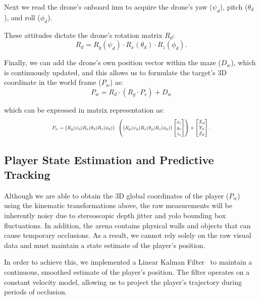 \documentclass{report_template_oxford}
\begin{document}
Next we read the drone's onboard \gls{imu} to acquire the drone's yaw ($\psi_d$), pitch ($\theta_d$), and roll ($\phi_d$). 

These attitudes dictate the drone's rotation matrix $R_d$:
\begin{equation}
    R_d = R_y(\psi_d) \cdot R_x(\theta_d) \cdot R_z(\phi_d).
\end{equation}

Finally, we can add the drone's own position vector within the maze ($D_w$), which is continuously updated, and this allows us to formulate the target's 3D coordinate in the world frame ($P_w$) as:
\begin{equation}
    P_w = R_d \cdot (R_g \cdot P_c) + D_w
\end{equation}

which can be expressed in matrix representation as:
\begin{equation}
    \resizebox{0.65\textwidth}{!}{%
        $P_w = \big( R_y(\psi_d) R_x(\theta_d) R_z(\phi_d) \big) \cdot \left( \big(R_y(\psi_g) R_x(\theta_g) R_z(\phi_g) \big) \begin{bmatrix} x_c \\ y_c \\ z_c \end{bmatrix} \right) + \begin{bmatrix} X_{d} \\ Y_{d} \\ Z_{d} \end{bmatrix}.$%
    }
\end{equation}

\subsection{Player State Estimation and Predictive Tracking}
Although we are able to obtain the 3D global coordinates of the player ($P_w$) using the kinematic transformations above, the raw measurements will be inherently noisy due to stereoscopic depth jitter and \gls{yolo} bounding box fluctuations. In addition, the arena contains physical walls and objects that can cause temporary occlusions. As a result, we cannot rely solely on the raw visual data and must maintain a state estimate of the player's position.

In order to achieve this, we implemented a Linear Kalman Filter~\cite{reid_kalman} to maintain a continuous, smoothed estimate of the player's position. The filter operates on a constant velocity model, allowing us to project the player's trajectory during periods of occlusion.
\end{document}
